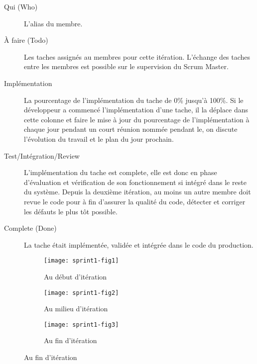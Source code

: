 \begin{description}
    \item [Qui (Who)] L'alias du membre.
    \item [À faire (Todo)] Les taches assignés au membres pour cette itération.
        L'échange des taches entre les membres est possible sur le supervision
        du Scrum Master.
    \item [Implémentation] La pourcentage de l'implémentation du tache de 0\%
        jusqu'à 100\%. Si le développeur a commencé l'implémentation d'une
        tache, il la déplace dans cette colonne et faire le mise à jour du
        pourcentage de l'implémentation à chaque jour pendant un court réunion
        nommée  pendant le, on discute l'évolution du
        travail et le plan du jour prochain.
    \item [Test/Intégration/Review] L'implémentation du tache est complete,
        elle est donc en phase d'évaluation et vérification de son
        fonctionnement si intégré dans le reste du système. Depuis la deuxième
        itération, au moins un autre membre doit revue le code pour à fin
        d'assurer la qualité du code, détecter et corriger les défauts le plus
        tôt possible.
    \item [Complete (Done)] La tache était implémentée, validée et intégrée
        dans le code du production.
\end{description}

\begin{figure}[htbp]
    \centering
    \caption{Évolution du travail}
    \begin{subfigure}{1\textwidth}
        \centering
        \texttt{[image: sprint1-fig1]}
        \caption{Au début d'itération}
        \label{fig:sprint1-fig1}
    \end{subfigure}

    \begin{subfigure}{1\textwidth}
        \centering
        \texttt{[image: sprint1-fig2]}
        \caption{Au milieu d'itération}
        \label{fig:sprint1-fig2}
    \end{subfigure}

    \begin{subfigure}{1\textwidth}
        \centering
        \texttt{[image: sprint1-fig3]}
        \caption{Au fin d'itération}
        \label{fig:sprint1-fig3}
    \end{subfigure}
\end{figure}
\clearpage

